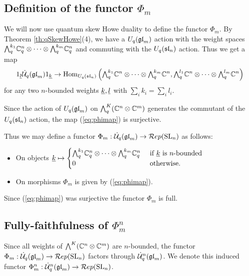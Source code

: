 \documentclass[11pt]{amsart}
\begin{document}
\subsection{Definition of the functor \texorpdfstring{$\Phi_m$}{Phi}}

We will now use  quantum skew Howe duality to define the functor $\Phi_m$. By Theorem \ref{th:qSkewHowe}(4), we have a $U_q(\gl_m)$ action with the weight spaces $\Alt{k_1}{q} \mathbb C_q^n \otimes \cdots \otimes \Alt{k_m}{q} \mathbb C_q^n$ and commuting with the $U_q(\sl_n)$ action. Thus we get a map
\begin{equation}\label{eq:phimap}
\one_\ul{l} \dU(\gl_m) \one_\ul{k} \rightarrow \Hom_{U_q(\sl_n)} \left(\Alt{k_1}{q} \mathbb C^n \otimes \cdots \otimes \Alt{k_m}{q} \mathbb C^n, \Alt{l_1}{q} \mathbb C^n \otimes \cdots \otimes \Alt{l_m}{q} \mathbb C^n\right)
\end{equation}
for any two $n$-bounded weights $\ul{k}, \ul{l}$ with $\sum_i k_i = \sum_i l_i $.

Since the action of $U_q(\gl_m)$  on $\Alt{K}{q}(\mathbb C^n \otimes \mathbb C^m) $ generates the commutant of the $U_q(\sl_n)$ action, the map (\ref{eq:phimap}) is surjective.

Thus we may define a functor $\Phi_m: \dU(\gl_m) \rightarrow \Rep(\SL_n)$ as follows:
\begin{itemize}
\item On objects
$\ul{k} \mapsto
\begin{cases}
\Alt{k_1}{q} \mathbb C_q^n \otimes \cdots \otimes \Alt{k_m}{q} \mathbb C_q^n & \text{ if } \ul{k} \text{ is } n\text{-bounded } \\
0 & \text{ otherwise.}
\end{cases}$
\item On morphisms $ \Phi_m $ is given by (\ref{eq:phimap}).
\end{itemize}
Since (\ref{eq:phimap}) was surjective the functor $\Phi_m$ is full.

\subsection{Fully-faithfulness of \texorpdfstring{$ \Phi_m^n$}{Phi}}
\label{sec:fully-faithful}

Since all weights of $\Alt{K}{}(\mathbb{C}^n \otimes \mathbb{C}^m)$ are $ n$-bounded, the functor $\Phi_m: \dU(\gl_m)\rightarrow \Rep(\SL_n)$ factors through $\dU^n(\gl_m)$. We denote this induced functor $\Phi_m^n: \dU^n(\gl_m) \rightarrow \Rep(\SL_n)$.
\end{document}
